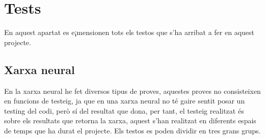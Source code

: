 ﻿\documentclass[10pt,a4paper,twocolumn,twoside]{article}
\begin{document}
\section{Tests}
En aquest apartat es e¡mensionen tots els testos que s'ha arribat a fer en aquest projecte.

\subsection{Xarxa neural}

En la xarxa neural he fet diversos tipus de proves, aquestes proves no consisteixen en funcions de testeig, ja que en una xarxa neural no té gaire sentit posar un testing del codi, però sí del resultat que dona, per tant, el testeig realitzat és sobre els resultats que retorna la xarxa, aquest s'han realitzat en diferents espais de temps que ha durat el projecte. Els testos es poden dividir en tres grans grups.
\end{document}
